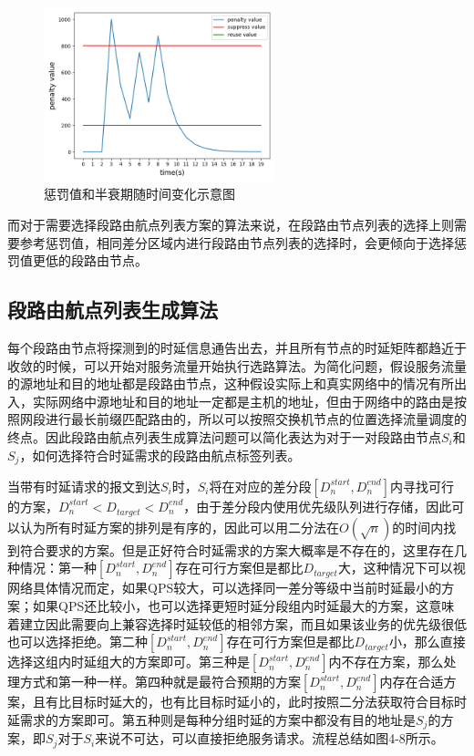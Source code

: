 \begin{figure}[htbp]
\setlength{\abovecaptionskip}{15pt plus 3pt minus 2pt}
\centerline{\includegraphics[width=0.6\textwidth]{./figures/ch4-penalty-value.png}}
\caption{惩罚值和半衰期随时间变化示意图}
\label{fig-ch4-penalty-value}
\end{figure}

而对于需要选择段路由航点列表方案的算法来说，在段路由节点列表的选择上则需要参考惩罚值，相同差分区域内进行段路由节点列表的选择时，会更倾向于选择惩罚值更低的段路由节点。

\subsection{段路由航点列表生成算法}

每个段路由节点将探测到的时延信息通告出去，并且所有节点的时延矩阵都趋近于收敛的时候，可以开始对服务流量开始执行选路算法。为简化问题，假设服务流量的源地址和目的地址都是段路由节点，这种假设实际上和真实网络中的情况有所出入，实际网络中源地址和目的地址一定都是主机的地址，但由于网络中的路由是按照网段进行最长前缀匹配路由的，所以可以按照交换机节点的位置选择流量调度的终点。因此段路由航点列表生成算法问题可以简化表达为对于一对段路由节点$S_i$和$S_j$，如何选择符合时延需求的段路由航点标签列表。

当带有时延请求的报文到达$S_i$时，$S_i$将在对应的差分段$[D_n^{start},D_n^{end}]$内寻找可行的方案，$D_n^{start}{<D}_{target}<D_n^{end}$，由于差分段内使用优先级队列进行存储，因此可以认为所有时延方案的排列是有序的，因此可以用二分法在$O\left(\sqrt n\right)$的时间内找到符合要求的方案。但是正好符合时延需求的方案大概率是不存在的，这里存在几种情况：第一种$[D_n^{start},D_n^{end}]$存在可行方案但是都比$D_{target}$大，这种情况下可以视网络具体情况而定，如果QPS较大，可以选择同一差分等级中当前时延最小的方案；如果QPS还比较小，也可以选择更短时延分段组内时延最大的方案，这意味着建立因此需要向上兼容选择时延较低的相邻方案，而且如果该业务的优先级很低也可以选择拒绝。第二种$[D_n^{start},D_n^{end}]$存在可行方案但是都比$D_{target}$小，那么直接选择这组内时延组大的方案即可。第三种是$\left[D_n^{start},D_n^{end}\right]$内不存在方案，那么处理方式和第一种一样。第四种就是最符合预期的方案$\left[D_n^{start},D_n^{end}\right]$内存在合适方案，且有比目标时延大的，也有比目标时延小的，此时按照二分法获取符合目标时延需求的方案即可。第五种则是每种分组时延的方案中都没有目的地址是$S_j$的方案，即$S_j$对于$S_i$来说不可达，可以直接拒绝服务请求。流程总结如图4-8所示。

